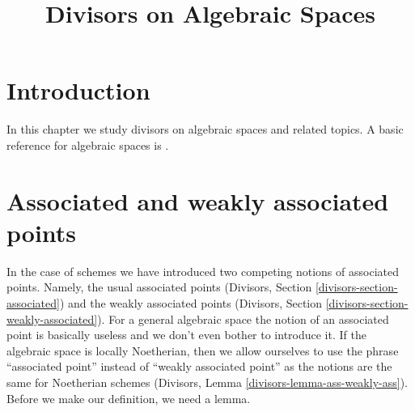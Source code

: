 \documentclass{stacks-project}
\theoremstyle{plain}
\theoremstyle{definition}
\theoremstyle{remark}
\numberwithin{equation}{subsection}
\begin{document}
\title{Divisors on Algebraic Spaces}


\maketitle

\label{section-phantom}

\tableofcontents

\section{Introduction}
\label{section-introduction}

\noindent
In this chapter we study divisors on algebraic spaces and related topics.
A basic reference for algebraic spaces is \cite{Kn}.









\section{Associated and weakly associated points}
\label{section-associated}

\noindent
In the case of schemes we have introduced two competing notions
of associated points. Namely, the usual associated points
(Divisors, Section \ref{divisors-section-associated})
and the weakly associated points
(Divisors, Section \ref{divisors-section-weakly-associated}).
For a general algebraic space the notion of an associated point
is basically useless and we don't even bother to introduce it.
If the algebraic space is locally Noetherian, then we allow ourselves
to use the phrase ``associated point'' instead of
``weakly associated point'' as the notions are the same for
Noetherian schemes (Divisors, Lemma \ref{divisors-lemma-ass-weakly-ass}).
Before we make our definition, we need a lemma.
\end{document}
